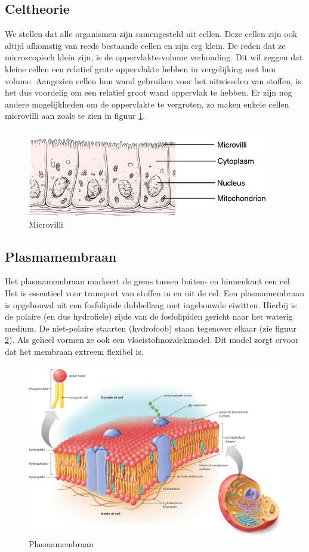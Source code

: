 \documentclass[a4paper,kul]{kulakarticle} %
\begin{document}
\subsection{Celtheorie}
We stellen dat alle organismen zijn samengesteld uit cellen. Deze cellen zijn ook altijd afkomstig van reeds bestaande cellen en zijn erg klein. De reden dat ze microscopisch klein zijn, is de oppervlakte-volume verhouding. Dit wil zeggen dat kleine cellen een relatief grote oppervlakte hebben in vergelijking met hun volume. Aangezien cellen hun wand gebruiken voor het uitwisselen van stoffen, is het dus voordelig om een relatief groot wand oppervlak te hebben. Er zijn nog andere mogelijkheden om de oppervlakte te vergroten, zo maken enkele cellen microvilli aan zoals te zien in figuur \ref{fig:microvilli}.
\begin{figure}[h]
	\centering
	\includegraphics[width=0.7\linewidth]{Microvilli}
	\caption[Microvilli]{Microvilli}
	\label{fig:microvilli}
\end{figure}
\newpage
\subsection{Plasmamembraan}
Het plasmamembraan markeert de grens tussen buiten- en binnenkant een cel. Het is essentieel voor transport van stoffen in en uit de cel. Een plasmamembraan is opgebouwd uit een fosfolipide dubbellaag met ingebouwde eiwitten. Hierbij is de polaire (en dus hydrofiele) zijde van de fosfolipiden gericht naar het waterig medium. De niet-polaire staarten (hydrofoob) staan tegenover elkaar (zie figuur \ref{fig:plasmamembraan}). Als geheel vormen ze ook een vloeistofmozaïekmodel. Dit model zorgt ervoor dat het membraan extreem flexibel is. 
\begin{figure}[h]
	\centering
	\includegraphics[width=0.8\linewidth]{Plasmamembraan}
	\caption[Plasmamembraan]{Plasmamembraan}
	\label{fig:plasmamembraan}
\end{figure}
\end{document}
